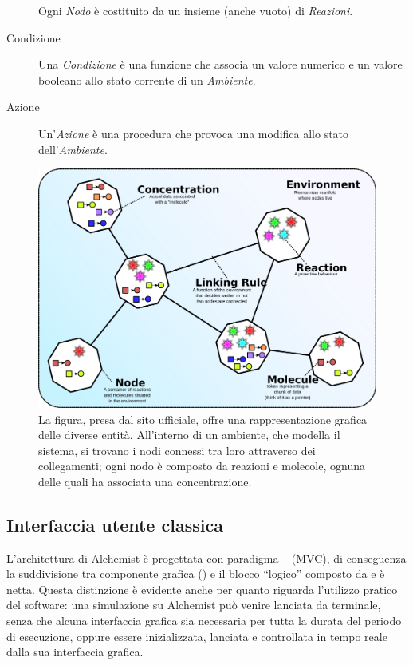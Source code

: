 \begin{description}
                    Ogni \emph{Nodo} è costituito da un insieme (anche vuoto) di \emph{Reazioni}.

                \item[Condizione]\label{itm:cond}
                    Una \emph{Condizione} è una funzione che associa un valore numerico e un valore booleano allo stato corrente di un \emph{Ambiente}.

                \item[Azione]\label{itm:act}
                    Un'\emph{Azione} è una procedura che provoca una modifica allo stato dell'\emph{Ambiente}.

            \end{description}

            \begin{figure}[htbp]
                \centering
                \includegraphics[scale=.4]{img/model}
                \caption{%
                    La figura, presa dal sito ufficiale, offre una rappresentazione grafica delle diverse entità.
                    All'interno di un ambiente, che modella il sistema, si trovano i nodi connessi tra loro attraverso dei collegamenti;
                    ogni nodo è composto da reazioni e molecole, ognuna delle quali ha associata una concentrazione.
                }
                \label{fig:model}
            \end{figure}

        \subsection{Interfaccia utente classica}\label{subsec:prevGui}
            L'architettura di Alchemist è progettata con paradigma ~\cite{mvc} (MVC), di conseguenza la suddivisione tra componente grafica () e il blocco ``logico'' composto da  e  è netta.
            Questa distinzione è evidente anche per quanto riguarda l'utilizzo pratico del software:
            una simulazione su Alchemist può venire lanciata da terminale, senza che alcuna interfaccia grafica sia necessaria per tutta la durata del periodo di esecuzione, oppure essere inizializzata, lanciata e controllata in tempo reale dalla sua interfaccia grafica.

